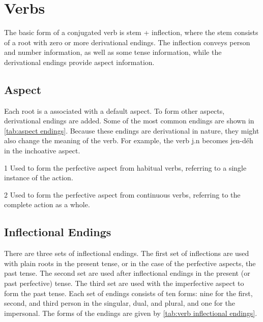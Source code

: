 \section{Verbs}
The basic form of a conjugated verb is stem + inflection, where the stem
consists of a root with zero or more derivational endings. The inflection
conveys person and number information, as well as some tense information, while
the derivational endings provide aspect information.

\subsection{Aspect}
Each root is a associated with a default aspect. To form other aspects,
derivational endings are added. Some of the most common endings are shown in
\cref{tab:aspect endings}. Because these endings are derivational in
nature, they might also change the meaning of the verb. For example, the verb
{\ll j.n}  becomes {\ll jen-déh}  in the inchoative
aspect.

\begin{table}[h]
\centering
\caption{Aspect Endings}
\label{tab:aspect endings}
\begin{threeparttable}
\begin{tablenotes}
\item[1] Used to form the perfective aspect from habitual verbs, referring to a
    single instance of the action.
\item[2] Used to form the perfective aspect from continuous verbs, referring to
    the complete action as a whole.
\end{tablenotes}
\end{threeparttable}
\end{table}

\subsection{Inflectional Endings}
There are three sets of inflectional endings. The first set of inflections are
used with plain roots in the present tense, or in the case of the perfective
aspects, the past tense. The second set are used after inflectional endings in
the present (or past perfective) tense. The third set are used with the
imperfective aspect to form the past tense. Each set of endings consists of ten
forms: nine for the first, second, and third person in the singular, dual, and
plural, and one for the impersonal. The forms of the endings are given by
\cref{tab:verb inflectional endings}.

